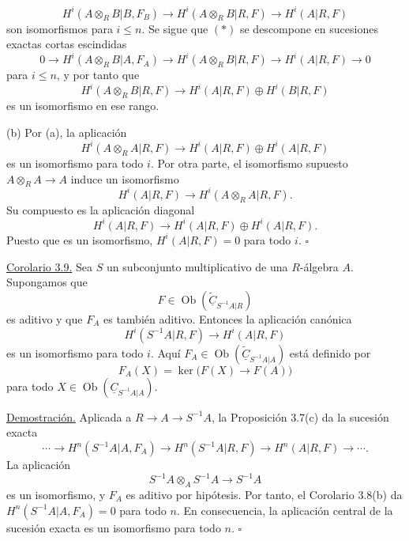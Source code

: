 \[
 H^i(A\otimes_RB|B,F_B)
 \longrightarrow H^i(A\otimes_RB|R,F)
 \longrightarrow H^i(A|R,F)
\]
son isomorfismos para $i\leq n$. Se sigue que $(*)$ se descompone en
sucesiones exactas cortas escindidas
\[
 0\longrightarrow H^i(A\otimes_RB|A,F_A)
 \longrightarrow H^i(A\otimes_RB|R,F)
 \longrightarrow H^i(A|R,F)\longrightarrow0
\]
para $i\leq n$, y por tanto que
\[
 H^i(A\otimes_RB|R,F)
 \longrightarrow H^i(A|R,F)\oplus H^i(B|R,F)
\]
es un isomorfismo en ese rango.

(b) Por (a), la aplicación
\[
 H^i(A\otimes_RA|R,F)
 \longrightarrow H^i(A|R,F)\oplus H^i(A|R,F)
\]
es un isomorfismo para todo $i$. Por otra parte, el isomorfismo supuesto
$A\otimes_RA\longrightarrow A$ induce un isomorfismo
\[
 H^i(A|R,F)\longrightarrow H^i(A\otimes_RA|R,F).
\]
Su compuesto es la aplicación diagonal
\[
 H^i(A|R,F)\longrightarrow
 H^i(A|R,F)\oplus H^i(A|R,F).
\]
Puesto que es un isomorfismo, $H^i(A|R,F)=0$ para todo $i$.
\hfill$\square$

\underline{Corolario 3.9.} Sea $S$ un subconjunto multiplicativo de una
$R$-álgebra $A$. Supongamos que
\[
 F\in\operatorname{Ob}
 (\widetilde{\underline C}_{S^{-1}A|R})
\]
es aditivo y que $F_A$ es también aditivo. Entonces la aplicación canónica
\[
 H^i(S^{-1}A|R,F)\longrightarrow H^i(A|R,F)
\]
es un isomorfismo para todo $i$. Aquí
$F_A\in\operatorname{Ob}
(\widetilde{\underline C}_{S^{-1}A|A})$ está definido por
\[
 F_A(X)=\ker\bigl(F(X)\longrightarrow F(A)\bigr)
\]
para todo
$X\in\operatorname{Ob}(\underline C_{S^{-1}A|A})$.

\underline{Demostración.} Aplicada a
$R\longrightarrow A\longrightarrow S^{-1}A$, la Proposición 3.7(c)
da la sucesión exacta
\[
 \cdots\longrightarrow H^n(S^{-1}A|A,F_A)
 \longrightarrow H^n(S^{-1}A|R,F)
 \longrightarrow H^n(A|R,F)\longrightarrow\cdots.
\]
La aplicación
\[
 S^{-1}A\otimes_AS^{-1}A\longrightarrow S^{-1}A
\]
\begingroup
\sloppy
es un isomorfismo, y $F_A$ es aditivo por hipótesis. Por tanto, el
Corolario 3.8(b) da $H^n(S^{-1}A|A,F_A)=0$ para todo $n$. En consecuencia,
la aplicación central de la sucesión exacta es un isomorfismo para todo
$n$. \hfill$\square$
\par
\endgroup
\par
